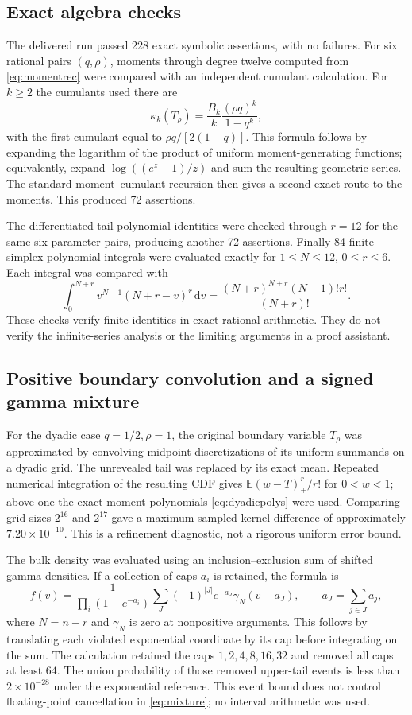 \documentclass[11pt,oneside]{article}
\numberwithin{equation}{section}
\theoremstyle{plain}
\theoremstyle{definition}
\theoremstyle{remark}
\newcommand{\E}{\mathbb E}
\newcommand{\dd}{\,\mathrm d}
\begin{document}
\subsection{Exact algebra checks}
The delivered run passed 228 exact symbolic assertions, with no failures.
For six rational pairs $(q,\rho)$, moments through degree twelve computed
from \eqref{eq:momentrec} were compared with an independent cumulant
calculation. For $k\ge2$ the cumulants used there are
\[
 \kappa_k(T_\rho)=\frac{B_k}{k}\frac{(\rho q)^k}{1-q^k},
\]
with the first cumulant equal to $\rho q/[2(1-q)]$.
This formula follows by expanding the logarithm of the product of
uniform moment-generating functions; equivalently, expand
$\log((e^z-1)/z)$ and sum the resulting geometric series.
The standard moment--cumulant recursion then gives a second exact
route to the moments. This produced 72 assertions.

The differentiated tail-polynomial identities were checked through
$r=12$ for the same six parameter pairs, producing another 72 assertions.
Finally 84 finite-simplex polynomial integrals were evaluated exactly for
$1\le N\le12$, $0\le r\le6$. Each integral was compared with
\[
 \int_0^{N+r}v^{N-1}(N+r-v)^r\dd v
 =\frac{(N+r)^{N+r}(N-1)!r!}{(N+r)!}.
\]
These checks verify finite identities in exact rational arithmetic.
They do not verify the infinite-series analysis or the limiting
arguments in a proof assistant.

\subsection{Positive boundary convolution and a signed gamma mixture}
For the dyadic case $q=1/2,\rho=1$, the original boundary variable
$T_\rho$ was approximated by convolving midpoint discretizations of
its uniform summands on a dyadic grid. The unrevealed tail was replaced
by its exact mean. Repeated numerical integration of the resulting
CDF gives $\E(w-T)_+^r/r!$ for $0<w<1$; above one the exact moment
polynomials \eqref{eq:dyadicpolys} were used. Comparing grid sizes
$2^{16}$ and $2^{17}$ gave a maximum sampled kernel difference of
approximately $7.20\times10^{-10}$. This is a refinement diagnostic,
not a rigorous uniform error bound.

The bulk density was evaluated using an inclusion--exclusion sum of
shifted gamma densities. If a collection of caps $a_i$ is retained,
the formula is
\begin{equation}\label{eq:mixture}
 f(v)=\frac{1}{\prod_i(1-e^{-a_i})}
       \sum_{J}(-1)^{|J|}e^{-a_J}\gamma_N(v-a_J),
 \qquad a_J=\sum_{j\in J}a_j,
\end{equation}
where $N=n-r$ and $\gamma_N$ is zero at nonpositive arguments.
This follows by translating each violated exponential coordinate by
its cap before integrating on the sum. The calculation retained the
caps $1,2,4,8,16,32$ and removed all caps at least $64$. The union
probability of those removed upper-tail events is less than
$2\times10^{-28}$ under the exponential reference. This event bound
does not control floating-point cancellation in \eqref{eq:mixture};
no interval arithmetic was used.
\end{document}
